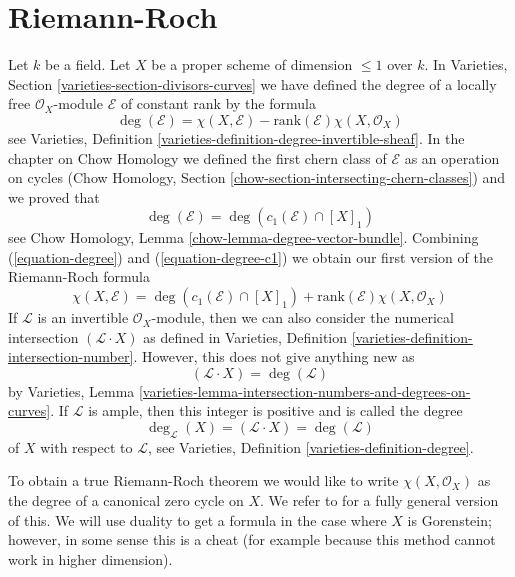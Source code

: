 \section{Riemann-Roch}
\label{section-Riemann-Roch}

\noindent
Let $k$ be a field. Let $X$ be a proper scheme of dimension $\leq 1$
over $k$. In Varieties, Section \ref{varieties-section-divisors-curves}
we have defined the degree of a locally free $\mathcal{O}_X$-module
$\mathcal{E}$ of constant rank by the formula
\begin{equation}
\label{equation-degree}
\deg(\mathcal{E}) =
\chi(X, \mathcal{E}) - \text{rank}(\mathcal{E})\chi(X, \mathcal{O}_X)
\end{equation}
see Varieties, Definition \ref{varieties-definition-degree-invertible-sheaf}.
In the chapter on Chow Homology we defined the first chern class of
$\mathcal{E}$ as an operation on cycles
(Chow Homology, Section
\ref{chow-section-intersecting-chern-classes}) and we proved that
\begin{equation}
\label{equation-degree-c1}
\deg(\mathcal{E}) = \deg(c_1(\mathcal{E}) \cap [X]_1)
\end{equation}
see Chow Homology, Lemma \ref{chow-lemma-degree-vector-bundle}.
Combining (\ref{equation-degree}) and (\ref{equation-degree-c1})
we obtain our first version of the Riemann-Roch formula
\begin{equation}
\label{equation-rr}
\chi(X, \mathcal{E}) =
\deg(c_1(\mathcal{E}) \cap [X]_1) +
\text{rank}(\mathcal{E})\chi(X, \mathcal{O}_X)
\end{equation}
If $\mathcal{L}$ is an invertible $\mathcal{O}_X$-module, then
we can also consider the numerical intersection
$(\mathcal{L} \cdot X)$ as defined in
Varieties, Definition \ref{varieties-definition-intersection-number}.
However, this does not give anything new as
\begin{equation}
\label{equation-numerical-degree}
(\mathcal{L} \cdot X) = \deg(\mathcal{L})
\end{equation}
by Varieties, Lemma
\ref{varieties-lemma-intersection-numbers-and-degrees-on-curves}. If
$\mathcal{L}$ is ample, then this integer is positive and is
called the degree
\begin{equation}
\label{equation-degree-X}
\deg_\mathcal{L}(X) = (\mathcal{L} \cdot X) = \deg(\mathcal{L})
\end{equation}
of $X$ with respect to $\mathcal{L}$, see
Varieties, Definition \ref{varieties-definition-degree}.

\medskip\noindent
To obtain a true Riemann-Roch theorem we would like to write
$\chi(X, \mathcal{O}_X)$ as the degree of a canonical zero cycle on $X$.
We refer to \cite{F} for a fully general version of this. We will use
duality to get a formula in the case where $X$ is Gorenstein; however,
in some sense this is a cheat (for example because this method cannot
work in higher dimension).

